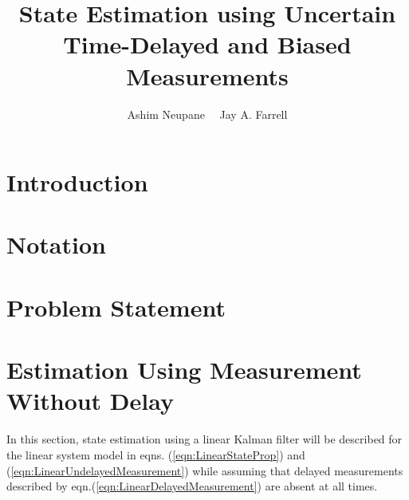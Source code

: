 
\usepackage{tikz}
\usepackage{wrapfig}
\usepackage{caption}
\usepackage{stfloats}
\DeclareMathAlphabet{}


\title{State Estimation using Uncertain Time-Delayed and Biased Measurements}
\author{Ashim Neupane \ \ Jay A. Farrell
}%

\maketitle

		
\section{Introduction}	
	
	
\section{Notation}	\label{sect:notation}
	

\section{Problem Statement}\label{sect:problem_statement}
	

\section{Estimation Using Measurement Without Delay} \label{sect:estimation_no_delayed_msr}
	In this section, state estimation using a linear Kalman filter will be described for the linear system model in eqns. (\ref{eqn:LinearStateProp}) and (\ref{eqn:LinearUndelayedMeasurement}) while assuming that delayed measurements described by eqn.(\ref{eqn:LinearDelayedMeasurement}) are absent at all times.\\
		
%	
%	

